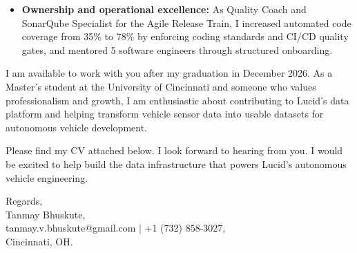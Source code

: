 \documentclass[11pt]{letter}
\begin{document}
\begin{letter}{}
\begin{itemize}[leftmargin=*, itemsep=0.45em]
    \item \textbf{Ownership and operational excellence:} As Quality Coach and SonarQube Specialist for the Agile Release Train, I increased automated code coverage from 35\% to 78\% by enforcing coding standards and CI/CD quality gates, and mentored 5 software engineers through structured onboarding.
\end{itemize}

I am available to work with you after my graduation in December 2026. As a Master's student at the University of Cincinnati and someone who values professionalism and growth, I am enthusiastic about contributing to Lucid's data platform and helping transform vehicle sensor data into usable datasets for autonomous vehicle development.

Please find my CV attached below. I look forward to hearing from you. I would be excited to help build the data infrastructure that powers Lucid's autonomous vehicle engineering.

{\setlength{\parskip}{0pt}
Regards,\\
Tanmay Bhuskute,\\
tanmay.v.bhuskute@gmail.com $\mid$ +1 (732) 858-3027,\\
Cincinnati, OH.
}

\end{letter}
\end{document}
